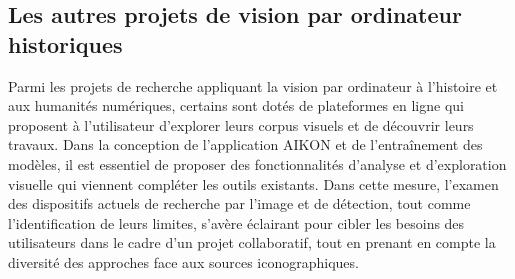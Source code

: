 \subsection{Les autres projets de vision par ordinateur historiques}

Parmi les projets de recherche appliquant la vision par ordinateur à l'histoire et aux humanités numériques, certains sont dotés de plateformes en ligne qui proposent à l’utilisateur d’explorer leurs corpus visuels et de découvrir leurs travaux. Dans la conception de l’application AIKON et de l'entraînement des modèles, il est essentiel de proposer des fonctionnalités d’analyse et d’exploration visuelle qui viennent compléter les outils existants. Dans cette mesure, l’examen des dispositifs actuels de recherche par l'image et de détection, tout comme l'identification de leurs limites, s'avère éclairant pour cibler les besoins des utilisateurs dans le cadre d’un projet collaboratif, tout en prenant en compte la diversité des approches face aux sources iconographiques.

